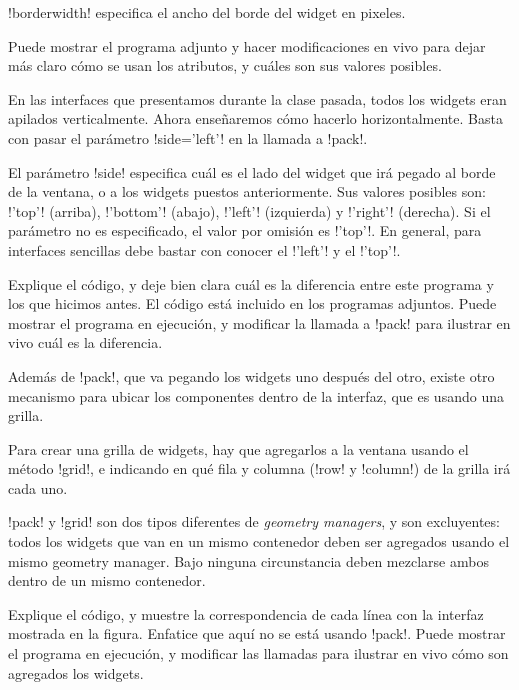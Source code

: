 \documentclass[10pt]{article}
\begin{document}
  \li!borderwidth! especifica el ancho del borde del widget en pixeles.

  Puede mostrar el programa adjunto
  y hacer modificaciones en vivo
  para dejar más claro cómo se usan los atributos,
  y cuáles son sus valores posibles.


  En las interfaces que presentamos durante la clase pasada,
  todos los widgets eran apilados verticalmente.
  Ahora enseñaremos cómo hacerlo horizontalmente.
  Basta con pasar el parámetro \li!side='left'!
  en la llamada a \li!pack!.

  El parámetro \li!side! especifica cuál es el lado del widget
  que irá pegado al borde de la ventana,
  o a los widgets puestos anteriormente.
  Sus valores posibles son:
  \li!'top'! (arriba),
  \li!'bottom'! (abajo),
  \li!'left'! (izquierda) y
  \li!'right'! (derecha).
  Si el parámetro no es especificado,
  el valor por omisión es \li!'top'!.
  En general, para interfaces sencillas
  debe bastar con conocer el \li!'left'! y el \li!'top'!.

  Explique el código, y deje bien clara cuál es la diferencia
  entre este programa y los que hicimos antes.
  El código está incluido en los programas adjuntos.
  Puede mostrar el programa en ejecución,
  y modificar la llamada a \li!pack!
  para ilustrar en vivo cuál es la diferencia.


  Además de \li!pack!,
  que va pegando los widgets uno después del otro,
  existe otro mecanismo para ubicar los componentes
  dentro de la interfaz,
  que es usando una grilla.

  Para crear una grilla de widgets,
  hay que agregarlos a la ventana usando el método \li!grid!,
  e indicando en qué fila y columna (\li!row! y \li!column!)
  de la grilla irá cada uno.

  \li!pack! y \li!grid! son dos tipos diferentes de \emph{geometry managers},
  y son excluyentes: todos los widgets que van en un mismo contenedor
  deben ser agregados usando el mismo geometry manager.
  Bajo ninguna circunstancia deben mezclarse ambos
  dentro de un mismo contenedor.

  Explique el código,
  y muestre la correspondencia de cada línea
  con la interfaz mostrada en la figura.
  Enfatice que aquí no se está usando \li!pack!.
  Puede mostrar el programa en ejecución,
  y modificar las llamadas
  para ilustrar en vivo cómo son agregados los widgets.
\end{document}
